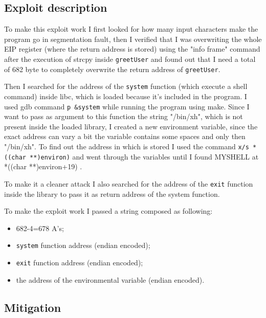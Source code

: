 \documentclass[a4paper,12pt]{article}
\begin{document}
\subsection{Exploit description} 

To make this exploit work I first looked for how many input characters make the program go in segmentation fault, then I verified that I was overwriting the whole EIP register (where the return address is stored) using the "info frame" command after the execution of strcpy inside \texttt{greetUser} and found out that I need a total of 682 byte to completely overwrite the return address of \texttt{greetUser}.

Then I searched for the address of the \texttt{system} function (which execute a shell command) inside libc, which is loaded because it's included in the program. I used gdb command \texttt{p \&system} while running the program using make. Since I want to pass as argument to this function the string "/bin/xh", which is not present inside the loaded library, I created a new environment variable, since the exact address can vary a bit the variable contains some spaces and only then "/bin/xh".
 To find out the address in which is stored I used the command \texttt{x/s *((char **)environ)} and went through the variables until I found MYSHELL at   *((char **)environ+19)%
.
 
To make it a cleaner attack I also searched for the address of the \texttt{exit} function inside the library to pass it as return address of the system function.

To make the exploit work I passed a string composed as following:
\begin{itemize}
\item 682-4=678 A's;
\item \texttt{system} function address (endian encoded);
\item \texttt{exit} function address (endian encoded);
\item the address of the environmental variable (endian encoded).
\end{itemize}


\subsection{Mitigation}
\end{document}
